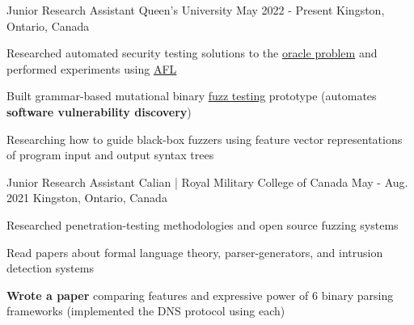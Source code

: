 

\begin{cventries}

  \cventry
    {Junior Research Assistant} %
    {Queen's University} %
    {May 2022 - Present} %
    {Kingston, Ontario, Canada} %
    {
      \begin{cvitems} %
        \item{Researched automated security testing solutions to the \href{https://en.wikipedia.org/wiki/Test_oracle}{oracle problem} and performed experiments using \href{https://lcamtuf.coredump.cx/afl/}{AFL}}
        \item{Built grammar-based mutational binary \href{https://en.wikipedia.org/wiki/Fuzzing}{fuzz testing} prototype (automates \textbf{software vulnerability discovery})} %
        \item{Researching how to guide black-box fuzzers using feature vector representations of program input and output syntax trees}
      \end{cvitems}
    }

  \cventry
    {Junior Research Assistant} %
    {Calian | Royal Military College of Canada} %
    {May - Aug. 2021} %
    {Kingston, Ontario, Canada} %
    {
      \begin{cvitems} %
        \item{Researched penetration-testing methodologies and open source fuzzing systems}
        \item{Read papers about formal language theory, parser-generators, and intrusion detection systems}%
        \item{\textbf{Wrote a paper} comparing features and expressive power of 6 binary parsing frameworks (implemented the DNS protocol using each)}
      \end{cvitems}
    }


\end{cventries}
